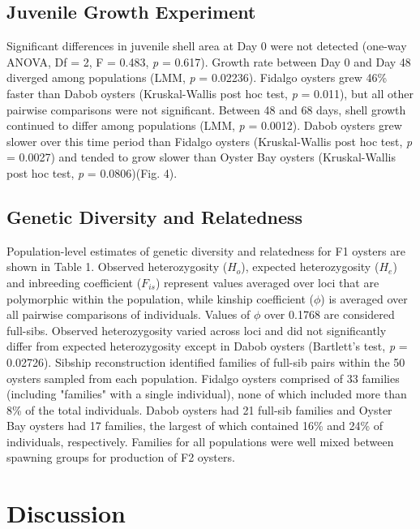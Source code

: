 \documentclass[fleqn,10pt]{wlscirep}
\begin{document}
\subsection*{Juvenile Growth Experiment}
Significant differences in juvenile shell area at Day 0 were not detected (one-way ANOVA, Df = 2, F = 0.483, \textit{p} = 0.617). Growth rate between Day 0 and Day 48 diverged among populations (LMM, \textit{p} = 0.02236). Fidalgo oysters grew 46\% faster than Dabob oysters (Kruskal-Wallis post hoc test, \textit{p} = 0.011), but all other pairwise comparisons were not significant. Between 48 and 68 days, shell growth continued to differ among populations (LMM, \textit{p} = 0.0012). Dabob oysters grew slower over this time period than Fidalgo oysters (Kruskal-Wallis post hoc test, \textit{p} = 0.0027) and tended to grow slower than Oyster Bay oysters (Kruskal-Wallis post hoc test, \textit{p} = 0.0806)(Fig. 4).

\subsection*{Genetic Diversity and Relatedness}  
Population-level estimates of genetic diversity and relatedness for F1 oysters are shown in Table 1. Observed heterozygosity ($H_{o}$), expected heterozygosity ($H_{e}$) and inbreeding coefficient ($F_{is}$) represent values averaged over loci that are polymorphic within the population, while kinship coefficient ($\phi$) is averaged over all pairwise comparisons of individuals. Values of $\phi$ over 0.1768 are considered full-sibs. Observed heterozygosity varied across loci and did not significantly differ from expected heterozygosity except in Dabob oysters (Bartlett's test, \textit{p} = 0.02726). Sibship reconstruction identified families of full-sib pairs within the 50 oysters sampled from each population. Fidalgo oysters comprised of 33 families (including "families" with a single individual), none of which included more than 8\% of the total individuals. Dabob oysters had 21 full-sib families and Oyster Bay oysters had 17 families, the largest of which contained 16\% and 24\% of individuals, respectively. Families for all populations were well mixed between spawning groups for production of F2 oysters.

\section*{Discussion}
\end{document}
